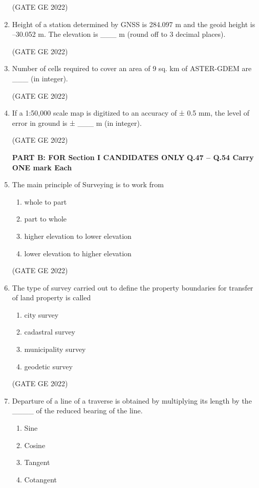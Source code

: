\documentclass[journal,12pt,onecolumn]{IEEEtran}
\theoremstyle{remark}
\begin{document}
\begin{enumerate}
\hfill (GATE GE 2022)

\item Height of a station determined by GNSS is 284.097 m and the geoid height is –30.052 m. The elevation is \_\_\_ m (round off to 3 decimal places).

\hfill (GATE GE 2022)

\item Number of cells required to cover an area of 9 sq. km of ASTER-GDEM are \_\_\_ (in integer).

\hfill (GATE GE 2022)

\item If a 1:50,000 scale map is digitized to an accuracy of ± 0.5 mm, the level of error in ground is ± \_\_\_ m (in integer).

\hfill (GATE GE 2022)

\textbf{PART B: FOR Section I CANDIDATES ONLY}
\textbf{Q.47 – Q.54 Carry ONE mark Each}

\item The main principle of Surveying is to work from
\begin{enumerate}
    \item whole to part
    \item part to whole
    \item higher elevation to lower elevation
    \item lower elevation to higher elevation
\end{enumerate}

\hfill (GATE GE 2022)

\item The type of survey carried out to define the property boundaries for transfer of land property is called
\begin{enumerate}
    \item city survey
    \item cadastral survey
    \item municipality survey
    \item geodetic survey
\end{enumerate}

\hfill (GATE GE 2022)

\item Departure of a line of a traverse is obtained by multiplying its length by the \_\_\_\_ of the reduced bearing of the line.
\begin{enumerate}
    \item Sine
    \item Cosine
    \item Tangent
    \item Cotangent
\end{enumerate}


\end{enumerate}
\end{document}
